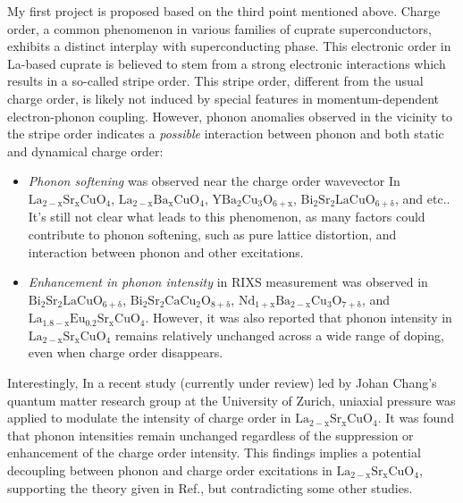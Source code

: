 \documentclass[11pt]{article}
\begin{document}
My first project is proposed based on the third point mentioned above. 
Charge order, a common phenomenon in various families of cuprate superconductors, exhibits a distinct interplay with superconducting phase. This electronic order in La-based cuprate is believed to stem from a strong electronic interactions which results in a so-called stripe order\cite{harriger_stripe_nodate,tranquada_evidence_1995,choi_disentangling_2020}. This stripe order, different from the usual charge order, is likely not induced by special features in momentum-dependent electron-phonon coupling. However, phonon anomalies observed in the vicinity to the stripe order indicates a \textit{possible} interaction between phonon and both static and dynamical charge order: 
\begin{itemize}
\item \textit{Phonon softening}  was observed near the charge order wavevector In $\mathrm{La_{2-x}Sr_{x}CuO_{4}}$\cite{lin_strongly_2020, wang_charge_2021, huang_quantum_2021}, $\mathrm{La_{2-x}Ba_{x}CuO_{4}}$\cite{miao_incommensurate_2018}, $\mathrm{YBa_{2}Cu_{3}O_{6+x}}$\cite{tacon_inelastic_2014}, $\mathrm{Bi_{2}Sr_{2}LaCuO_{6+\delta}}$\cite{li_multiorbital_2020}, and etc.. It's still not clear what leads to this phenomenon, as many factors could contribute to phonon softening, such as pure lattice distortion\cite{lin_strongly_2020}, and interaction between phonon and other excitations.  
\item \textit{Enhancement in phonon intensity}  in RIXS measurement was observed in $\mathrm{Bi_{2}Sr_{2}LaCuO_{6+\delta}}$\cite{li_multiorbital_2020}, $\mathrm{Bi_{2}Sr_{2}CaCu_{2}O_{8+\delta}}$\cite{chaix_dispersive_2017}, $\mathrm{Nd_{1+x}Ba_{2-x}Cu_{3}O_{7+\delta}}$\cite{braicovich_determining_2020}, and $\mathrm{La_{1.8-x}Eu_{0.2}Sr_xCuO_{4}}$\cite{peng_enhanced_2020,wang_charge_2021,huang_quantum_2021}. However, it was also reported that phonon intensity in $\mathrm{La_{2-x}Sr_{x}CuO_{4}}$ remains relatively unchanged across a wide range of doping, even when charge order disappears\cite{lin_strongly_2020}.  
\end{itemize}

Interestingly, In a recent study (currently under review) led by Johan Chang's quantum matter research group at the University of Zurich, uniaxial pressure was applied to modulate the intensity of charge order in $\mathrm{La_{2-x}Sr_{x}CuO_{4}}$. It was found that phonon intensities remain unchanged regardless of the suppression or enhancement of the charge order intensity. This findings implies a potential decoupling between phonon and charge order excitations in $\mathrm{La_{2-x}Sr_{x}CuO_{4}}$, supporting the theory given in Ref.\cite{lin_strongly_2020}, but contradicting some other studies\cite{li_multiorbital_2020, chaix_dispersive_2017,huang_quantum_2021}. 
\end{document}
